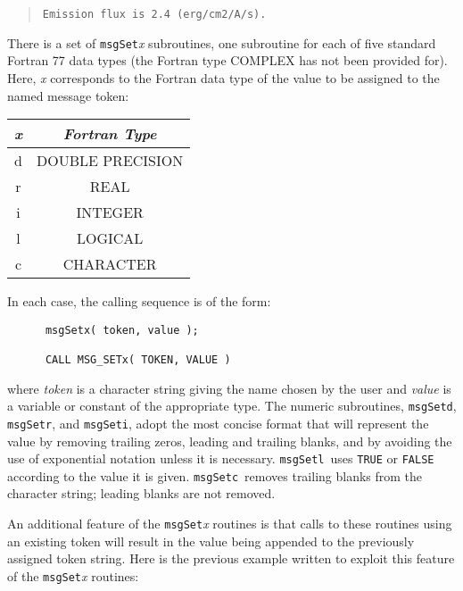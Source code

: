 \documentclass[twoside,11pt]{article}
\renewcommand{\_}{\texttt{\symbol{95}}}
\newcommand{\func}[1]{\texttt{#1}}
\newcommand{\farg}[1]{\textit{#1}}
\newcommand{\msgsetr}{\func{msgSetr}}
\newcommand{\msgsetd}{\func{msgSetd}}
\newcommand{\msgseti}{\func{msgSeti}}
\newcommand{\msgsetl}{\func{msgSetl}}
\newcommand{\msgsetc}{\func{msgSetc}}
\begin{document}
\begin {quote}
\begin {small}
\begin{verbatim}
Emission flux is 2.4 (erg/cm2/A/s).
\end{verbatim}
\end {small}
\end {quote}

There is a set of \func{msgSet}\textit{x} subroutines, one subroutine for each of five
standard Fortran 77 data types (the Fortran type COMPLEX has not been provided
for).
Here, \textit{x} corresponds to the Fortran data type of the value to be assigned
to the named message token:

\begin {center}
\begin {tabular}{||c|c||}
\hline
\textit{x} & \textit{Fortran Type}\\
\hline
d & DOUBLE PRECISION\\
r & REAL\\
i & INTEGER\\
l & LOGICAL\\
c & CHARACTER\\
\hline
\end {tabular}
\end {center}

In each case, the calling sequence is of the form:

\begin {small}
\begin{verbatim}
      msgSetx( token, value );

      CALL MSG_SETx( TOKEN, VALUE )
\end{verbatim}
\end {small}

where \farg{token} is a character string giving the name chosen by the user and \farg{value}
is a variable or constant of the appropriate type.
The numeric subroutines, \msgsetd, \msgsetr, and \msgseti, adopt the most
concise format that will represent the value by removing trailing zeros,
leading and trailing blanks, and by avoiding the use of exponential notation
unless it is necessary. 
\msgsetl\ uses \texttt{TRUE} or \texttt{FALSE} according to the value it is
given. \msgsetc\ removes trailing blanks from the character string; leading
blanks are not removed.

An additional feature of the \func{msgSet}\textit{x} routines is that calls to these 
routines using an existing token will result in the value being appended 
to the previously assigned token string.
Here is the previous example written to exploit this feature of the 
\func{msgSet}\textit{x} routines:
\end{document}
